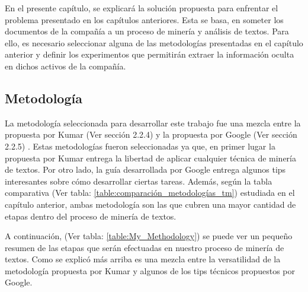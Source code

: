 
En el presente capítulo, se explicará la solución propuesta para enfrentar el problema presentado en los capítulos anteriores. Esta se basa, en someter los documentos de la compañía a un proceso de minería y análisis de textos. Para ello, es necesario seleccionar alguna de las metodologías presentadas en el capítulo anterior y definir los experimentos que permitirán extraer la información oculta en dichos activos de la compañía.

\subsection{Metodología}
    La metodología seleccionada para desarrollar este trabajo fue una mezcla entre la propuesta por Kumar (Ver sección 2.2.4) y la propuesta por Google (Ver sección 2.2.5) . Estas metodologías fueron seleccionadas ya que, en primer lugar la propuesta por Kumar entrega la libertad de aplicar cualquier técnica de minería de textos. Por otro lado, la guía desarrollada por Google entrega algunos tips interesantes sobre cómo desarrollar ciertas tareas. Además, según la tabla comparativa (Ver tabla: \ref{table:comparación_metodologías_tm}) estudiada en el
    capítulo anterior, ambas metodología son las que cubren una mayor cantidad de etapas dentro del proceso de minería de textos. 
    
    A continuación, (Ver tabla: \ref{table:My_Methodology})  se puede ver un pequeño resumen de las etapas que serán efectuadas en nuestro proceso de minería de textos. Como se explicó más arriba es una mezcla entre la versatilidad de la metodología propuesta por Kumar y algunos de los tips técnicos propuestos por Google.
    
